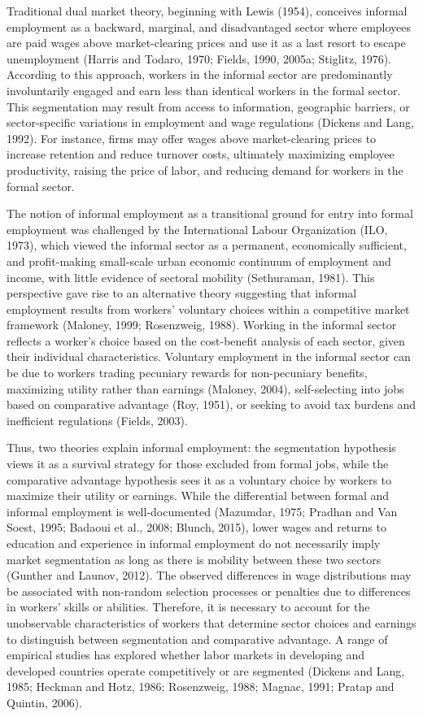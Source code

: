 Traditional dual market theory, beginning with Lewis (1954), conceives informal employment as a backward, marginal, and disadvantaged sector where employees are paid wages above market-clearing prices and use it as a last resort to escape unemployment (Harris and Todaro, 1970; Fields, 1990, 2005a; Stiglitz, 1976). According to this approach, workers in the informal sector are predominantly involuntarily engaged and earn less than identical workers in the formal sector. This segmentation may result from access to information, geographic barriers, or sector-specific variations in employment and wage regulations (Dickens and Lang, 1992). For instance, firms may offer wages above market-clearing prices to increase retention and reduce turnover costs, ultimately maximizing employee productivity, raising the price of labor, and reducing demand for workers in the formal sector.

The notion of informal employment as a transitional ground for entry into formal employment was challenged by the International Labour Organization (ILO, 1973), which viewed the informal sector as a permanent, economically sufficient, and profit-making small-scale urban economic continuum of employment and income, with little evidence of sectoral mobility (Sethuraman, 1981). This perspective gave rise to an alternative theory suggesting that informal employment results from workers' voluntary choices within a competitive market framework (Maloney, 1999; Rosenzweig, 1988). Working in the informal sector reflects a worker's choice based on the cost-benefit analysis of each sector, given their individual characteristics. Voluntary employment in the informal sector can be due to workers trading pecuniary rewards for non-pecuniary benefits, maximizing utility rather than earnings (Maloney, 2004), self-selecting into jobs based on comparative advantage (Roy, 1951), or seeking to avoid tax burdens and inefficient regulations (Fields, 2003).

Thus, two theories explain informal employment: the segmentation hypothesis views it as a survival strategy for those excluded from formal jobs, while the comparative advantage hypothesis sees it as a voluntary choice by workers to maximize their utility or earnings. While the differential between formal and informal employment is well-documented (Mazumdar, 1975; Pradhan and Van Soest, 1995; Badaoui et al., 2008; Blunch, 2015), lower wages and returns to education and experience in informal employment do not necessarily imply market segmentation as long as there is mobility between these two sectors (Gunther and Launov, 2012). The observed differences in wage distributions may be associated with non-random selection processes or penalties due to differences in workers' skills or abilities. Therefore, it is necessary to account for the unobservable characteristics of workers that determine sector choices and earnings to distinguish between segmentation and comparative advantage. A range of empirical studies has explored whether labor markets in developing and developed countries operate competitively or are segmented (Dickens and Lang, 1985; Heckman and Hotz, 1986; Rosenzweig, 1988; Magnac, 1991; Pratap and Quintin, 2006).

